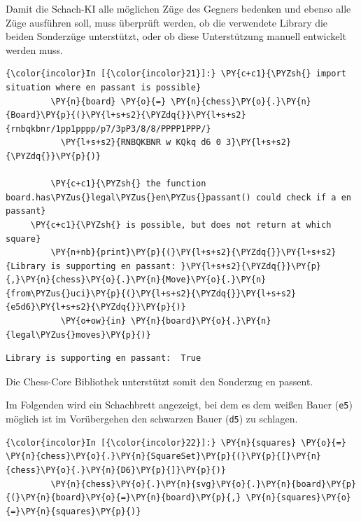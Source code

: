 Damit die Schach-KI alle möglichen Züge des Gegners bedenken und ebenso
alle Züge ausführen soll, muss überprüft werden, ob die verwendete
Library die beiden Sonderzüge unterstützt, oder ob diese Unterstützung
manuell entwickelt werden muss.

    \begin{Verbatim}[commandchars=\\\{\}]
{\color{incolor}In [{\color{incolor}21}]:} \PY{c+c1}{\PYZsh{} import situation where en passant is possible}
         \PY{n}{board} \PY{o}{=} \PY{n}{chess}\PY{o}{.}\PY{n}{Board}\PY{p}{(}\PY{l+s+s2}{\PYZdq{}}\PY{l+s+s2}{rnbqkbnr/1pp1pppp/p7/3pP3/8/8/PPPP1PPP/}
		   \PY{l+s+s2}{RNBQKBNR w KQkq d6 0 3}\PY{l+s+s2}{\PYZdq{}}\PY{p}{)}
         
         \PY{c+c1}{\PYZsh{} the function board.has\PYZus{}legal\PYZus{}en\PYZus{}passant() could check if a en passant}
	 \PY{c+c1}{\PYZsh{} is possible, but does not return at which square}
         \PY{n+nb}{print}\PY{p}{(}\PY{l+s+s2}{\PYZdq{}}\PY{l+s+s2}{Library is supporting en passant: }\PY{l+s+s2}{\PYZdq{}}\PY{p}{,}\PY{n}{chess}\PY{o}{.}\PY{n}{Move}\PY{o}{.}\PY{n}{from\PYZus{}uci}\PY{p}{(}\PY{l+s+s2}{\PYZdq{}}\PY{l+s+s2}{e5d6}\PY{l+s+s2}{\PYZdq{}}\PY{p}{)} 
		   \PY{o+ow}{in} \PY{n}{board}\PY{o}{.}\PY{n}{legal\PYZus{}moves}\PY{p}{)}
\end{Verbatim}


    \begin{Verbatim}[commandchars=\\\{\}]
Library is supporting en passant:  True

    \end{Verbatim}

    Die Chess-Core Bibliothek unterstützt somit den Sonderzug en passent.

Im Folgenden wird ein Schachbrett angezeigt, bei dem es dem weißen Bauer
(\texttt{e5}) möglich ist im Vorübergehen den schwarzen Bauer
(\texttt{d5}) zu schlagen.

    \begin{Verbatim}[commandchars=\\\{\}]
{\color{incolor}In [{\color{incolor}22}]:} \PY{n}{squares} \PY{o}{=} \PY{n}{chess}\PY{o}{.}\PY{n}{SquareSet}\PY{p}{(}\PY{p}{[}\PY{n}{chess}\PY{o}{.}\PY{n}{D6}\PY{p}{]}\PY{p}{)}
         \PY{n}{chess}\PY{o}{.}\PY{n}{svg}\PY{o}{.}\PY{n}{board}\PY{p}{(}\PY{n}{board}\PY{o}{=}\PY{n}{board}\PY{p}{,} \PY{n}{squares}\PY{o}{=}\PY{n}{squares}\PY{p}{)} 
\end{Verbatim}

